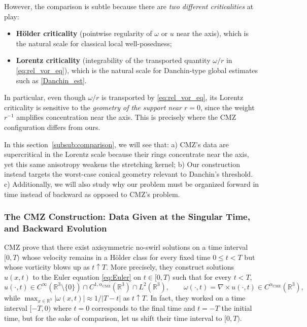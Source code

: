 \documentclass[reqno,11pt]{amsart}
\begin{document}
However, the comparison is subtle because there are \emph{two different criticalities} at play:
\begin{itemize}
\item \textbf{H\"older criticality} (pointwise regularity of $\omega$ or $u$ near the axis), which is the
natural scale for classical local well-posedness;
\item \textbf{Lorentz criticality} (integrability of the transported quantity $\omega/r$ in \eqref{eq:rel_vor_eq}), which is
the natural scale for Danchin-type global estimates such as \eqref{Danchin_est}.
\end{itemize}
In particular, even though $\omega/r$ is transported by \eqref{eq:rel_vor_eq}, its Lorentz criticality is 
sensitive to the \emph{geometry of the support near $r=0$}, since the weight $r^{-1}$ amplifies
concentration near the axis. This is precisely where the CMZ configuration differs from ours.


In this section~\ref{subsub:comparison}, we will see that: a) CMZ's data are supercritical in the Lorentz scale because their rings concentrate near the axis, yet this same anisotropy weakens the stretching kernel; b) Our construction instead targets the worst-case conical geometry relevant to Danchin's threshold. c) Additionally, we will also study why our problem must be organized forward in time instead of backward as opposed to CMZ's problem.

\subsubsection{The CMZ Construction: Data Given at the Singular Time, and Backward Evolution}

CMZ prove that there exist axisymmetric no-swirl solutions on a time interval $[0,T)$
whose velocity remains in a H\"older class for every fixed time $0\leq t<T$ but whose vorticity
blows up as $t\uparrow T$. More precisely, they construct solutions $u(x,t)$ to the Euler equation \eqref{eq:Euler}
on $t\in[0,T)$ such that for every $t<T$,
\[
u(\cdot, t)\in C^\infty(\mathbb{R}^3\setminus\{0\})\cap C^{1,\alpha_{\mathrm{CMZ}}}(\mathbb{R}^3)\cap L^2(\mathbb{R}^3),
\qquad
\omega(\cdot,t)=\nabla\times u(\cdot,t)\in C^{\alpha_{\mathrm{CMZ}}}(\mathbb{R}^3),
\]
while
$\max_{x\in\mathbb{R}^3}|\omega(x,t)|\approx 1/|T-t|$ as $t\uparrow T.$
In fact, they worked on a time interval $[-T,0)$ where $t=0$ corresponds to the final time and $t=-T$ the initial time, but for the sake of comparison, let us shift their time interval to $[0,T)$.
\end{document}
